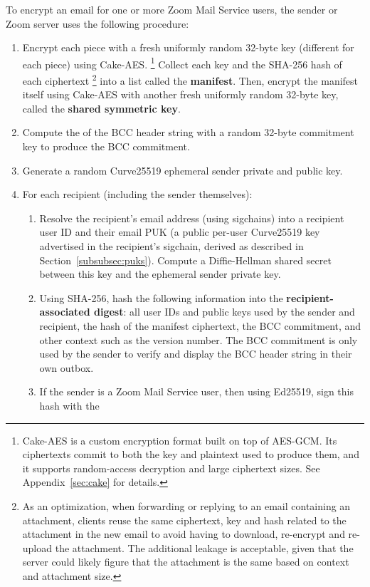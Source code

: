 To encrypt an email for one or more Zoom Mail Service users, the sender or Zoom server uses the
following procedure:
\begin{enumerate}
\item Encrypt each piece with a fresh uniformly random 32-byte key (different for each piece) using
Cake-AES.%
%
\footnote{Cake-AES is a custom encryption format built on top of AES-GCM. Its ciphertexts commit to
both the key and plaintext used to produce them, and it supports random-access decryption and large
ciphertext sizes. See Appendix~\ref{sec:cake} for details.} %
%
Collect each key and the SHA-256 hash of each ciphertext%
%
\footnote{As an optimization, when forwarding or replying to an email containing an attachment,
clients reuse the same ciphertext, key and hash related to the attachment in the new email to avoid
having to download, re-encrypt and re-upload the attachment. The additional leakage is acceptable,
given that the server could likely figure that the attachment is the same based on context and
attachment size.}
%
into a list called the \textbf{manifest}. Then, encrypt the manifest itself using Cake-AES with
another fresh uniformly random 32-byte key, called the \textbf{shared symmetric key}.
\item Compute the \HMACSHATWO of the BCC header string with a random 32-byte commitment key to
produce the BCC commitment.
\item Generate a random Curve25519 ephemeral sender private and public key.
\item For each recipient (including the sender themselves):
\begin{enumerate}
\item Resolve the recipient's email address (using sigchains) into a recipient user ID and their
email PUK (a public per-user Curve25519 key advertised in the recipient's sigchain, derived as
described in Section~\ref{subsubsec:puks}). Compute a Diffie-Hellman shared secret between this key
and the ephemeral sender private key.
\item Using SHA-256, hash the following information into the \textbf{recipient-associated digest}:
all user IDs and public keys used by the sender and recipient, the hash of the manifest ciphertext,
the BCC commitment, and other context such as the version number. The BCC commitment is only used by
the sender to verify and display the BCC header string in their own outbox.
\item If the sender is a Zoom Mail Service user, then using Ed25519, sign this hash with the

\end{enumerate}
\end{enumerate}
